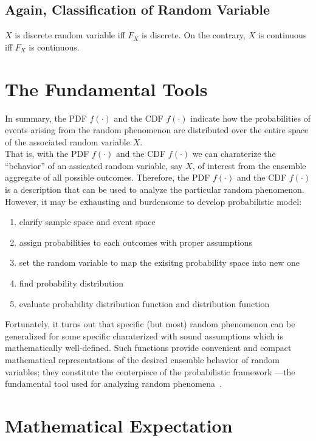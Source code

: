 \documentclass[twoside]{article}
\theoremstyle{definition}
\theoremstyle{remark}
\theoremstyle{remark}
\begin{document}
\subsection{Again, Classification of Random Variable}
$X$ is discrete random variable iff $F_X$ is discrete. On the contrary, $X$ is
continuous iff $F_X$ is continuous.


\section{The Fundamental Tools}
In summary, the PDF $f(\cdot)$ and the CDF $f(\cdot)$ indicate how the probabilities
of events arising from the random phenomenon are distributed over the entire space
of the associated random variable $X$. \\[0.5\baselineskip]
That is, with the PDF $f(\cdot)$ and the CDF $f(\cdot)$ we can charaterize the
``behavior'' of an assicated random variable, say $X$, of interest from the
ensemble aggregate of all possible outcomes. Therefore, the PDF $f(\cdot)$ and
the CDF $f(\cdot)$ is a description that can be used to analyze the particular
random phenomenon. \\[0.5\baselineskip]
However, it may be exhausting and burdensome to develop probabilistic model:
\begin{enumerate}
  \item clarify sample space and event space
  \item assign probabilities to each outcomes with proper assumptions
  \item set the random variable to map the exisitng probability space into new one
  \item find probability distribution
  \item evaluate probability distribution function and distribution function
\end{enumerate}
Fortunately, it turns out that specific (but most) random phenomenon can be
generalized for some specific  charaterized
with sound assumptions which is mathematically well-defined. Such functions provide
convenient and compact mathematical representations of the desired ensemble behavior
of random variables; they constitute the centerpiece of the probabilistic framework
---the fundamental tool used for analyzing random phenomena~\cite{RP-Babatunde-2009}.

\section{Mathematical Expectation}
\end{document}
